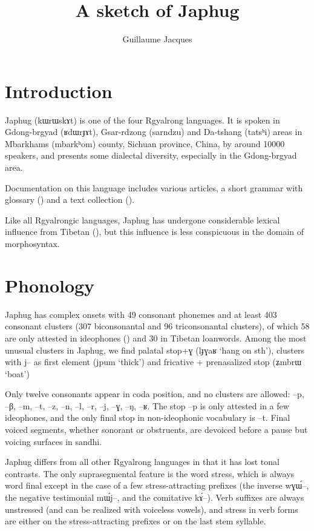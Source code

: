 \documentclass[oldfontcommands,oneside,a4paper,11pt]{article}
\newcommand{\ipa}[1]{{\phon #1}} %
\begin{document}
 

\title{A sketch of Japhug}
\author{Guillaume Jacques}
\maketitle

\section{Introduction}
Japhug (\ipa{kɯrɯskɤt}) is one of the four Rgyalrong languages. It is spoken in Gdong-brgyad (\ipa{ʁdɯrɟɤt}), Gsar-rdzong (\ipa{sarndzu}) and Da-tshang (\ipa{tatsʰi}) areas in Mbarkhams (\ipa{mbarkʰom}) county, Sichuan province, China, by around 10000 speakers, and presents some dialectal diversity, especially in the Gdong-brgyad area.

Documentation on this language includes various articles, a short grammar with glossary (\citealt{jacques08}) and a text collection (\citealt{jacques10gesar}).

Like all Rgyalrongic languages, Japhug has undergone considerable lexical influence from Tibetan (\citealt{jacques04these}), but this influence is less conspicuous in the domain of morphosyntax.



\section{Phonology}
Japhug has complex onsets with 49 consonant phonemes and at least 403 consonant clusters (307 biconsonantal and 96 triconsonantal clusters), of which 58 are only attested in ideophones (\citealt{japhug14ideophones}) and 30 in Tibetan loanwords. Among the most unusual clusters in Japhug, we find palatal stop+\ipa{ɣ} (\ipa{lɟɣaʁ} `hang on sth'), clusters with \ipa{j--} as first element (\ipa{jpum} `thick') and fricative + prenasalized stop (\ipa{ʑmbrɯ} `boat')


Only twelve   consonants appear in coda position, and no clusters are allowed:  \ipa{--p}, \ipa{--β}, \ipa{--m}, \ipa{--t}, \ipa{--z}, \ipa{--n}, \ipa{--l}, \ipa{--r}, \ipa{--j}, \ipa{--ɣ}, \ipa{--ŋ}, \ipa{--ʁ}. The stop \ipa{--p} is only attested in a few ideophones, and the only final stop in non-ideophonic vocabulary is \ipa{--t}. Final voiced segments, whether sonorant or obstruents, are devoiced before a pause but voicing surfaces in sandhi.

Japhug differs from all other Rgyalrong languages in that it has lost tonal contrasts. The only suprasegmental feature is the word stress, which is always word final except in the case of a few stress-attracting prefixes (the inverse \ipa{wɣɯ́--}, the negative testimonial \ipa{mɯ́j--}, and the comitative \ipa{kɤ́--}). Verb suffixes are always unstressed (and can be realized with voiceless vowels), and stress in verb forms are either on the stress-attracting prefixes or on the last stem syllable.
\end{document}
